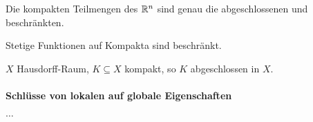 \begin{satz} Die kompakten Teilmengen des $\mathbb R^n$ sind genau die abgeschlossenen und beschränkten.
\end{satz}

\begin{kor}
Stetige Funktionen auf Kompakta sind beschränkt.
\end{kor}
\begin{kor}
$X$ Hausdorff-Raum, $K \subseteq X$ kompakt, so $K$ abgeschlossen in $X$. \\
\end{kor}

\paragraph*{Schlüsse von lokalen auf globale Eigenschaften}

$\dots$
